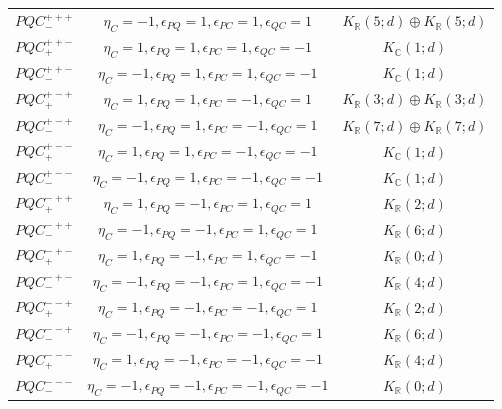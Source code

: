 \documentclass{tADP2e}
\theoremstyle{plain}
\theoremstyle{plain}
\theoremstyle{definition}
\begin{document}
\begin{appendices}
\begin{table}[tbp]
\begin{center}
\begin{tabular}{ccc}
$PQC^{+++}_-$ & %
$\eta_C=-1,\epsilon_{PQ}=1,\epsilon_{PC}=1,\epsilon_{QC}=1$ & $K_{\mathbb{R}}(5;d)\oplus K_{\mathbb{R}}(5;d)$ \\
$PQC^{++-}_+$ & %
$\eta_C=1,\epsilon_{PQ}=1,\epsilon_{PC}=1,\epsilon_{QC}=-1$ & $K_{\mathbb{C}}(1;d)$ \\
$PQC^{++-}_-$ & %
$\eta_C=-1,\epsilon_{PQ}=1,\epsilon_{PC}=1,\epsilon_{QC}=-1$ & $K_{\mathbb{C}}(1;d)$ \\
$PQC^{+-+}_+$ & %
$\eta_C=1,\epsilon_{PQ}=1,\epsilon_{PC}=-1,\epsilon_{QC}=1$ & $K_{\mathbb{R}}(3;d)\oplus K_{\mathbb{R}}(3;d)$ \\
$PQC^{+-+}_-$ & %
$\eta_C=-1,\epsilon_{PQ}=1,\epsilon_{PC}=-1,\epsilon_{QC}=1$ & $K_{\mathbb{R}}(7;d)\oplus K_{\mathbb{R}}(7;d)$ \\
$PQC^{+--}_+$ & %
$\eta_C=1,\epsilon_{PQ}=1,\epsilon_{PC}=-1,\epsilon_{QC}=-1$ & $K_{\mathbb{C}}(1;d)$ \\
$PQC^{+--}_-$ & %
$\eta_C=-1,\epsilon_{PQ}=1,\epsilon_{PC}=-1,\epsilon_{QC}=-1$ & $K_{\mathbb{C}}(1;d)$ \\
$PQC^{-++}_+$ & %
$\eta_C=1,\epsilon_{PQ}=-1,\epsilon_{PC}=1,\epsilon_{QC}=1$ & $K_{\mathbb{R}}(2;d)$ \\
$PQC^{-++}_-$ & %
$\eta_C=-1,\epsilon_{PQ}=-1,\epsilon_{PC}=1,\epsilon_{QC}=1$ & $K_{\mathbb{R}}(6;d)$ \\
$PQC^{-+-}_+$ & %
$\eta_C=1,\epsilon_{PQ}=-1,\epsilon_{PC}=1,\epsilon_{QC}=-1$ & $K_{\mathbb{R}}(0;d)$ \\
$PQC^{-+-}_-$ & %
$\eta_C=-1,\epsilon_{PQ}=-1,\epsilon_{PC}=1,\epsilon_{QC}=-1$ & $K_{\mathbb{R}}(4;d)$ \\
$PQC^{--+}_+$ & %
$\eta_C=1,\epsilon_{PQ}=-1,\epsilon_{PC}=-1,\epsilon_{QC}=1$ & $K_{\mathbb{R}}(2;d)$ \\
$PQC^{--+}_-$ & %
$\eta_C=-1,\epsilon_{PQ}=-1,\epsilon_{PC}=-1,\epsilon_{QC}=1$ & $K_{\mathbb{R}}(6;d)$ \\
$PQC^{---}_+$ & %
$\eta_C=1,\epsilon_{PQ}=-1,\epsilon_{PC}=-1,\epsilon_{QC}=-1$ & $K_{\mathbb{R}}(4;d)$ \\
$PQC^{---}_-$ & %
$\eta_C=-1,\epsilon_{PQ}=-1,\epsilon_{PC}=-1,\epsilon_{QC}=-1$ & $K_{\mathbb{R}}(0;d)$ \\
\hline\hline
\end{tabular}
\end{center}
\label{tableA2}
\end{table}



\end{appendices}
\end{document}
